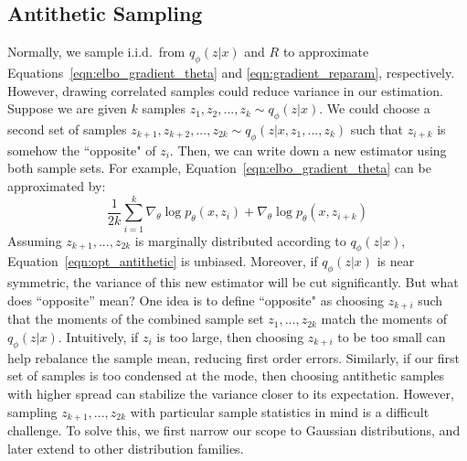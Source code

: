 \subsection{Antithetic Sampling}
Normally, we sample i.i.d.~from $q_\phi(z|x)$ and $R$ to approximate Equations~\ref{eqn:elbo_gradient_theta} and \ref{eqn:gradient_reparam}, respectively. However, drawing correlated samples could reduce variance in our estimation. Suppose we are given $k$ samples $z_1, z_2, ..., z_{k} \sim q_\phi(z|x)$. We could choose a second set of samples $z_{k+1}, z_{k+2},  ..., z_{2k} \sim q_\phi(z|x, z_1, ..., z_k)$ such that $z_{i+k}$ is somehow the ``opposite" of $z_{i}$. Then, we can write down a new estimator using both sample sets. For example, Equation~\ref{eqn:elbo_gradient_theta} can be approximated by:
\begin{equation}
\frac{1}{2k}\sum_{i=1}^{k} \nabla_\theta \log p_\theta(x, z_i) + \nabla_\theta \log p_\theta(x, z_{i+k})
\label{eqn:opt_antithetic}
\end{equation}
Assuming $z_{k+1}, ..., z_{2k}$ is marginally distributed according to $q_\phi(z|x)$, Equation~\ref{eqn:opt_antithetic} is unbiased. Moreover, if $q_\phi(z|x)$ is near symmetric, the variance of this new estimator will be cut significantly. But what does ``opposite'' mean? One idea is to define ``opposite" as choosing $z_{k+i}$ such that the moments of the combined sample set $z_1, ..., z_{2k}$ match the moments of $q_\phi(z|x)$. Intuitively, if $z_i$ is too large, then choosing $z_{k+i}$ to be too small can help rebalance the sample mean, reducing first order errors. Similarly, if our first set of samples is too condensed at the mode, then choosing antithetic samples with higher spread can stabilize the variance closer to its expectation. However, sampling $z_{k+1}, ..., z_{2k}$ with particular sample statistics in mind is a difficult challenge. To solve this, we first narrow our scope to Gaussian distributions, and later extend to other distribution families.


